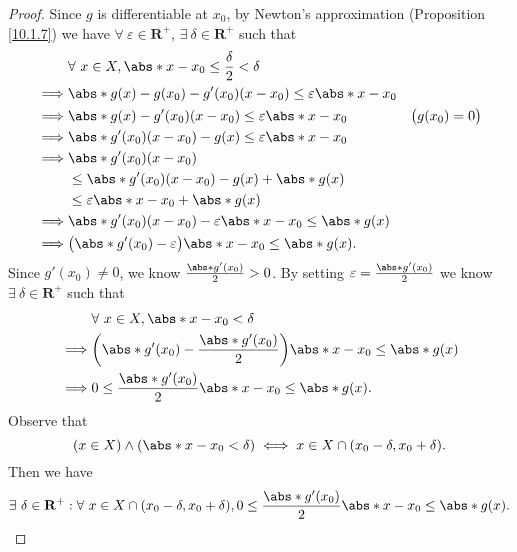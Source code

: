 \begin{proof}
    Since \(g\) is differentiable at \(x_0\), by Newton's approximation (Proposition \ref{10.1.7}) we have \(\forall\ \varepsilon \in \mathbf{R}^+\), \(\exists\ \delta \in \mathbf{R}^+\) such that
    \begin{align*}
                 & \forall\ x \in X, \abs*{x - x_0} \leq \frac{\delta}{2} < \delta                                \\
        \implies & \abs*{g(x) - g(x_0) - g'(x_0)(x - x_0)} \leq \varepsilon \abs*{x - x_0}                        \\
        \implies & \abs*{g(x) - g'(x_0)(x - x_0)} \leq \varepsilon \abs*{x - x_0}          & \big(g(x_0) = 0\big) \\
        \implies & \abs*{g'(x_0)(x - x_0) - g(x)} \leq \varepsilon \abs*{x - x_0}                                 \\
        \implies & \abs*{g'(x_0)(x - x_0)}                                                                        \\
                 & \leq \abs*{g'(x_0)(x - x_0) - g(x)} + \abs*{g(x)}                                              \\
                 & \leq \varepsilon \abs*{x - x_0} + \abs*{g(x)}                                                  \\
        \implies & \abs*{g'(x_0)(x - x_0)} - \varepsilon \abs*{x - x_0} \leq \abs*{g(x)}                          \\
        \implies & \big(\abs*{g'(x_0)} - \varepsilon\big)\abs*{x - x_0} \leq \abs*{g(x)}.
    \end{align*}
    Since \(g'(x_0) \neq 0\), we know \(\frac{\abs*{g'(x_0)}}{2} > 0\).
    By setting \(\varepsilon = \frac{\abs*{g'(x_0)}}{2}\) we know \(\exists\ \delta \in \mathbf{R}^+\) such that
    \begin{align*}
                 & \forall\ x \in X, \abs*{x - x_0} < \delta                                             \\
        \implies & \bigg(\abs*{g'(x_0)} - \frac{\abs*{g'(x_0)}}{2}\bigg) \abs*{x - x_0} \leq \abs*{g(x)} \\
        \implies & 0 \leq \frac{\abs*{g'(x_0)}}{2} \abs*{x - x_0} \leq \abs*{g(x)}.
    \end{align*}
    Observe that
    \[
        (x \in X) \land (\abs*{x - x_0} < \delta) \iff x \in X \cap (x_0 - \delta, x_0 + \delta).
    \]
    Then we have
    \[
        \exists\ \delta \in \mathbf{R}^+ : \forall\ x \in X \cap (x_0 - \delta, x_0 + \delta), 0 \leq \frac{\abs*{g'(x_0)}}{2} \abs*{x - x_0} \leq \abs*{g(x)}.
\]
\end{proof}
